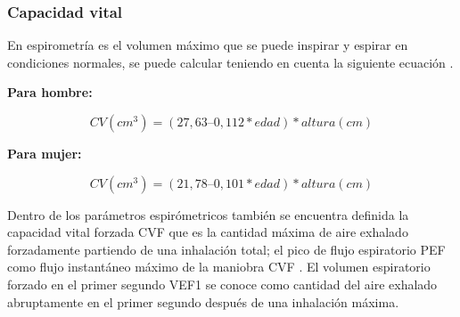 \documentclass[12pt]{article}
\begin{document}










\subsubsection{Capacidad vital} 

En espirometría es el volumen máximo que se puede inspirar y espirar en condiciones normales, se puede calcular teniendo en cuenta la siguiente ecuación \cite{50}.

\textbf{Para hombre:}

\begin{equation}
 CV (cm^3)= (27,63 – 0,112 * edad)* altura (cm)
\end{equation}


\textbf{Para mujer:}
    
\begin{equation}
   CV (cm^3)= (21,78 – 0,101 * edad) * altura (cm)
\end{equation}


Dentro de los parámetros espirómetricos también se encuentra definida la capacidad vital forzada CVF que es la cantidad máxima de aire exhalado forzadamente partiendo de una inhalación total; el pico de flujo espiratorio PEF como flujo instantáneo máximo de la maniobra CVF \cite{29}. El volumen espiratorio forzado en el primer segundo VEF1 se conoce como cantidad del aire exhalado abruptamente en el primer segundo después de una inhalación máxima. 
\end{document}

